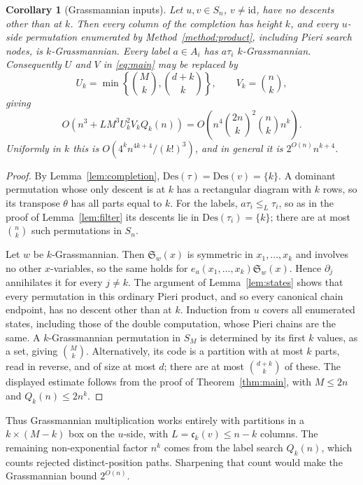 \documentclass{amsart}
\newtheorem{corollary}[theorem]{Corollary}
\theoremstyle{definition}
\theoremstyle{remark}
\numberwithin{equation}{section}
\newcommand{\Sch}{\mathfrak S}
\newcommand{\code}{\mathfrak c}
\newcommand{\id}{\mathrm{id}}
\newcommand{\Des}{\mathrm{Des}}
\begin{document}
\begin{corollary}[Grassmannian inputs]\label{cor:grass}
Let $u,v\in S_n$, $v\ne\id$, have no descents other than at $k$.
Then every column of the completion has height $k$, and every $u$-side
permutation enumerated by Method~\ref{method:product}, including
Pieri search nodes, is $k$-Grassmannian.
Every label $a\in A_i$ has $a\tau_i$ $k$-Grassmannian.
Consequently $U$ and $V$ in \eqref{eq:main} may be replaced by
\[
 U_k=\min\left\{\binom{M}{k},\binom{d+k}{k}\right\},\qquad
 V_k=\binom nk ,
\]
giving
\[
 O\left(n^3+LM^3U_k^2V_kQ_k(n)\right)
 =O\left(n^{4}\binom{2n}{k}^{2}\binom nk n^{k}\right).
\]
Uniformly in $k$ this is $O(4^kn^{4k+4}/(k!)^3)$, and in general it is
$2^{O(n)}n^{k+4}$.
\end{corollary}
\begin{proof}
By Lemma~\ref{lem:completion}, $\Des(\tau)=\Des(v)=\{k\}$.
A dominant permutation whose only descent is at $k$ has a rectangular
diagram with $k$ rows, so its transpose $\theta$ has all parts equal to
$k$.
For the labels, $a\tau_i\leq_L\tau_i$, so as in the proof of
Lemma~\ref{lem:filter} its descents lie in $\Des(\tau_i)=\{k\}$;
there are at most $\binom nk$ such permutations in $S_n$.

Let $w$ be $k$-Grassmannian. Then $\Sch_w(x)$ is symmetric in
$x_1,\ldots,x_k$ and involves no other $x$-variables, so the same
holds for $e_a(x_1,\ldots,x_k)\Sch_w(x)$.
Hence $\partial_j$ annihilates it for every $j\ne k$.
The argument of Lemma~\ref{lem:states} shows that every permutation in
this ordinary Pieri product, and so every canonical chain endpoint,
has no descent other than at $k$.
Induction from $u$ covers all enumerated states, including those of
the double computation, whose Pieri chains are the same.
A $k$-Grassmannian permutation in $S_M$ is determined by its first $k$
values, as a set, giving $\binom Mk$.
Alternatively, its code is a partition with at most $k$ parts,
read in reverse, and of size at most $d$; there are at most
$\binom{d+k}{k}$ of these.
The displayed estimate follows from the proof of Theorem~\ref{thm:main},
with $M\leq 2n$ and $Q_k(n)\leq 2n^k$.
\end{proof}

Thus Grassmannian multiplication works entirely with partitions in a
$k\times(M-k)$ box on the $u$-side, with
$L=\code_k(v)\leq n-k$ columns.
The remaining non-exponential factor $n^{k}$ comes from the label
search $Q_k(n)$, which counts rejected distinct-position paths.
Sharpening that count would make the Grassmannian bound $2^{O(n)}$.
\end{document}
